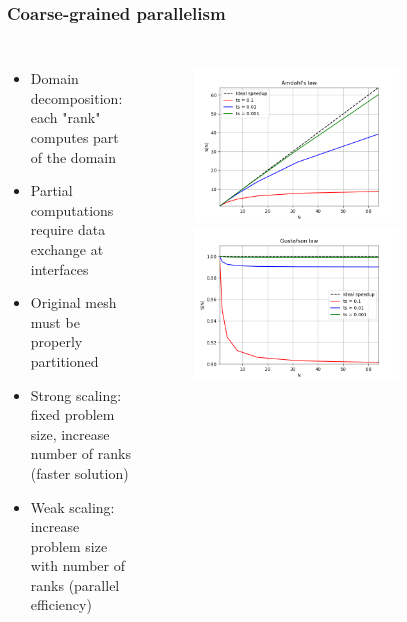 \begin{frame}
	\frametitle{Coarse-grained parallelism}
	\begin{columns}
		\begin{itemize}
			\item Domain decomposition: each "rank" computes part of the domain
			\item Partial computations require data exchange at interfaces
			\item Original mesh must be properly partitioned
			\item Strong scaling: fixed problem size, increase number of ranks (faster solution)
			\item Weak scaling: increase problem size with number of ranks (parallel efficiency)
		\end{itemize}
		\begin{figure}
			\centering
			\includegraphics[width=0.74\textwidth]{images/amdahl.png}
			\includegraphics[width=0.74\textwidth]{images/gustafson.png}
		\end{figure}
		\end{columns}
\end{frame}

